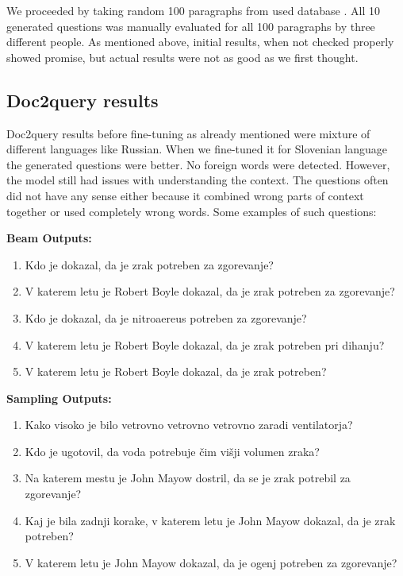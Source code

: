 \documentclass[fleqn,moreauthors,10pt]{ds_report}
\begin{document}
We proceeded by taking random 100 paragraphs from used database \cite{slosquad}. All 10 generated questions was manually evaluated for all 100 paragraphs by three different people. As mentioned above, initial results, when not checked properly showed promise, but actual results were not as good as we first thought. 

\subsection*{Doc2query results}
Doc2query results before fine-tuning as already mentioned were mixture of different languages like Russian. When we fine-tuned it for Slovenian language the generated questions were better. No foreign words were detected. However, the model still had issues with understanding the context. The questions often did not have any sense either because it combined wrong parts of context together or used completely wrong words. Some examples of such questions:

\begin{tcolorbox}[colback=lightgray,colframe=gray!75!black, title=Example 1, label=example:ex1]

\textbf{Beam Outputs:}
\begin{enumerate}
    \item Kdo je dokazal, da je zrak potreben za zgorevanje?
    \item V katerem letu je Robert Boyle dokazal, da je zrak potreben za zgorevanje?
    \item Kdo je dokazal, da je nitroaereus potreben za zgorevanje?
    \item V katerem letu je Robert Boyle dokazal, da je zrak potreben pri dihanju?
    \item V katerem letu je Robert Boyle dokazal, da je zrak potreben?
\end{enumerate}
\textbf{Sampling Outputs:}
\begin{enumerate}
    \item Kako visoko je bilo vetrovno vetrovno vetrovno zaradi ventilatorja?
    \item Kdo je ugotovil, da voda potrebuje čim višji volumen zraka?
    \item Na katerem mestu je John Mayow dostril, da se je zrak potrebil za zgorevanje?
    \item Kaj je bila zadnji korake, v katerem letu je John Mayow dokazal, da je zrak potreben?
    \item V katerem letu je John Mayow dokazal, da je ogenj potreben za zgorevanje?
\end{enumerate}
\end{tcolorbox}
\end{document}
